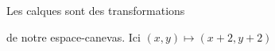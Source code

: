 \documentclass[preview]{standalone}
\begin{document}
\begin{center}
Les calques sont des transformations 
        
de notre espace-canevas. Ici $(x,y) \mapsto (x + 2, y + 2)$
\end{center}
\end{document}
